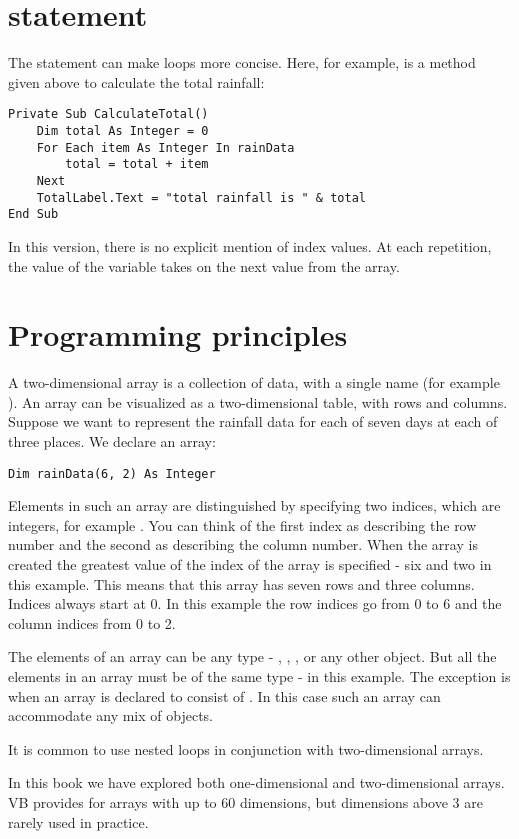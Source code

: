 	\section{ statement}
		The  statement can make loops more concise. Here, for example, is a method given above to calculate the total rainfall:
		\begin{lstlisting}
Private Sub CalculateTotal()
	Dim total As Integer = 0
	For Each item As Integer In rainData
		total = total + item
	Next
	TotalLabel.Text = "total rainfall is " & total
End Sub
		\end{lstlisting}
		In this version, there is no explicit mention of index values. At each repetition, the value of the variable  takes on the next value from the array.

	\section{Programming principles}
		A two-dimensional array is a collection of data, with a single name (for example ). An array can be visualized as a two-dimensional table, with rows and columns. Suppose we want to represent the rainfall data for each of seven days at each of three places. We declare an array:
		\begin{lstlisting}
Dim rainData(6, 2) As Integer
		\end{lstlisting}
		Elements in such an array are distinguished by specifying two indices, which are integers, for example . You can think of the first index as describing the row number and the second as describing the column number. When the array is created the greatest value of the index of the array is specified - six and two in this example. This means that this array has seven rows and three columns. Indices always start at 0. In this example the row indices go from 0 to 6 and the column indices from 0 to 2.
		
		The elements of an array can be any type - , , , or any other object. But all the elements in an array must be of the same type -  in this example. The exception is when an array is declared to consist of . In this case such an array can accommodate any mix of objects.
		
		It is common to use nested  loops in conjunction with two-dimensional arrays.
		
		In this book we have explored both one-dimensional and two-dimensional arrays. VB provides for arrays with up to 60 dimensions, but dimensions above 3 are rarely used in practice.


